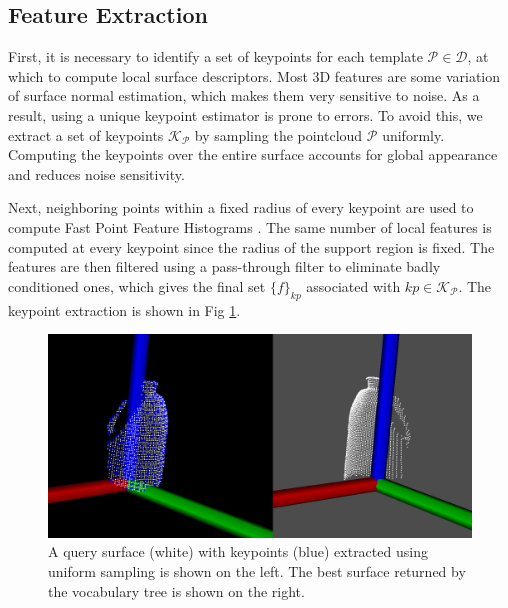 \subsection{Feature Extraction}
\label{subsec:feat_extract}
First, it is necessary to identify a set of keypoints for each template $\mathcal{P} \in \mathcal{D}$, at which to compute local surface descriptors. Most 3D features are some variation of surface normal estimation, which makes them very sensitive to noise. As a result, using a unique keypoint estimator is prone to errors. To avoid this, we extract a set of keypoints $\mathcal{K}_\mathcal{P}$ by sampling the pointcloud $\mathcal{P}$ uniformly. Computing the keypoints over the entire surface accounts for global appearance and reduces noise sensitivity.

Next, neighboring points within a fixed radius of every keypoint are used to compute Fast Point Feature Histograms \cite{RusuDoctoralDissertation}. The same number of local features is computed at every keypoint since the radius of the support region is fixed. The features are then filtered using a pass-through filter to eliminate badly conditioned ones, which gives the final set $\{f\}_{kp}$ associated with $kp \in \mathcal{K}_\mathcal{P}$. The keypoint extraction is shown in Fig \ref{fig:vocabtree_result}.
\begin{figure}[H]
	\centering
		\includegraphics[width=\linewidth]{figs/vtree_detection_crp.png}
	\caption{A query surface (white) with keypoints (blue) extracted using uniform sampling is shown on the left. The best surface returned by the vocabulary tree is shown on the right.}
	\label{fig:vocabtree_result}
\end{figure}

